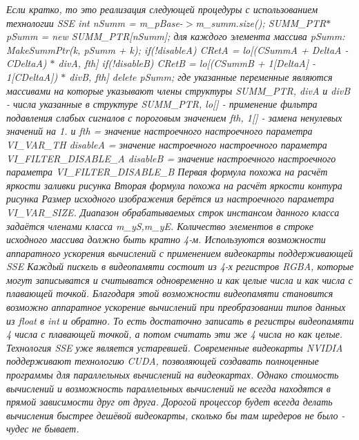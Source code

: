 \begin{DoxyCompactItemize}
\begin{DoxyCompactList}\small\item\em Если кратко, то это реализация следующей процедуры с использованием технологии S\+S\+E int n\+Summ = m\+\_\+p\+Base-\/$>$m\+\_\+summ.\+size(); S\+U\+M\+M\+\_\+\+P\+T\+R$\ast$ p\+Summ = new S\+U\+M\+M\+\_\+\+P\+T\+R\mbox{[}n\+Summ\mbox{]}; для каждого элемента массива p\+Summ\+: Make\+Summ\+Ptr(k, p\+Summ + k); if(!disable\+A) C\+Ret\+A = lo\mbox{[}(C\+Summ\+A + Delta\+A -\/ C\+Delta\+A) $\ast$ div\+A, fth\mbox{]} if(!disable\+B) C\+Ret\+B = lo\mbox{[}(C\+Summ\+B + 1\mbox{[}Delta\+A\mbox{]} -\/ 1\mbox{[}C\+Delta\+A\mbox{]}) $\ast$ div\+B, fth\mbox{]} delete p\+Summ; где указанные переменные являются массивами на которые указывают члены структуры S\+U\+M\+M\+\_\+\+P\+T\+R, div\+A и div\+B -\/ числа указанные в структуре S\+U\+M\+M\+\_\+\+P\+T\+R, lo\mbox{[}\mbox{]} -\/ применение фильтра подавления слабых сигналов с пороговым значением fth, 1\mbox{[}\mbox{]} -\/ замена ненулевых значений на 1. и fth = значение настроечного настроечного параметра V\+I\+\_\+\+V\+A\+R\+\_\+\+T\+H disable\+A = значение настроечного настроечного параметра V\+I\+\_\+\+F\+I\+L\+T\+E\+R\+\_\+\+D\+I\+S\+A\+B\+L\+E\+\_\+\+A disable\+B = значение настроечного настроечного параметра V\+I\+\_\+\+F\+I\+L\+T\+E\+R\+\_\+\+D\+I\+S\+A\+B\+L\+E\+\_\+\+B Первая формула похожа на расчёт яркости заливки рисунка Вторая формула похожа на расчёт яркости контура рисунка Размер исходного изображения берётся из настроечного параметра V\+I\+\_\+\+V\+A\+R\+\_\+\+S\+I\+Z\+E. Диапазон обрабатываемых строк инстансом данного класса задаётся членами класса m\+\_\+y\+S,m\+\_\+y\+E. Количество элементов в строке исходного массива должно быть кратно 4-\/м. Используются возможности аппаратного ускорения вычислений с применением видеокарты поддерживающей S\+S\+E Каждый пискель в видеопамяти состоит из 4-\/х регистров R\+G\+B\+A, которые могут записыватся и считыватся одновременно и как целые числа и как числа с плавающей точкой. Благодаря этой возможности видеопамяти становится возможно аппаратное ускорение вычислений при преобразовании типов данных из float в int и обратно. То есть достаточно записать в регистры видеопамяти 4 числа с плавающей точкой, а потом считать эти же 4 числа но как целые. Технология S\+S\+E уже является устаревшей. Современные видеокарты N\+V\+I\+D\+I\+A поддерживают технологию C\+U\+D\+A, позволяющей создавать полноценные программы для параллельных вычислений на видеокартах. Однако стоимость вычислений и возможность параллельных вычислений не всегда находятся в прямой зависимости друг от друга. Дорогой процессор будет всегда делать вычисления быстрее дешёвой видеокарты, сколько бы там шредеров не было -\/ чудес не бывает. \end{DoxyCompactList}\item 

\end{DoxyCompactItemize}
